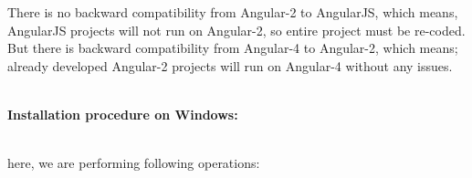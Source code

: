\documentclass{article}
\begin{document}
\noindent \\ \\ There is no backward compatibility from Angular-2 to AngularJS, which means, AngularJS projects will not run on Angular-2, so entire project must be re-coded. But there is backward compatibility from Angular-4 to Angular-2, which means; already developed Angular-2 projects will run on Angular-4 without any issues.



\newpage




\noindent \\ {\large \textbf{Installation procedure on Windows:}}

\noindent \\ here, we are performing following operations:
\end{document}
